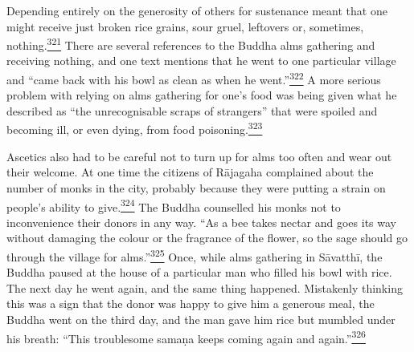 Depending entirely on the generosity of others for sustenance meant that
one might receive just broken rice grains, sour gruel, leftovers or,
sometimes,
nothing.\label{footprints_split_011.html_fnref321}\hyperref[footprints_split_024.htmlux5cux23fn321]{\textsuperscript{321}}
There are several references to the Buddha alms gathering and receiving
nothing, and one text mentions that he went to one particular village
and ``came back with his bowl as clean as when he
went.''\label{footprints_split_011.html_fnref322}\hyperref[footprints_split_024.htmlux5cux23fn322]{\textsuperscript{322}}
A more serious problem with relying on alms gathering for one's food was
being given what he described as ``the unrecognisable scraps of
strangers'' that were spoiled and becoming ill, or even dying, from food
poisoning.\label{footprints_split_011.html_fnref323}\hyperref[footprints_split_024.htmlux5cux23fn323]{\textsuperscript{323}}

Ascetics also had to be careful not to turn up for alms too often and
wear out their welcome. At one time the citizens of Rājagaha complained
about the number of monks in the city, probably because they were
putting a strain on people's ability to
give.\label{footprints_split_011.html_fnref324}\hyperref[footprints_split_024.htmlux5cux23fn324]{\textsuperscript{324}}
The Buddha counselled his monks not to inconvenience their donors in any
way. ``As a bee takes nectar and goes its way without damaging the
colour or the fragrance of the flower, so the sage should go through the
village for
alms.''\label{footprints_split_011.html_fnref325}\hyperref[footprints_split_024.htmlux5cux23fn325]{\textsuperscript{325}}
Once, while alms gathering in Sāvatthī, the Buddha paused at the house
of a particular man who filled his bowl with rice. The next day he went
again, and the same thing happened. Mistakenly thinking this was a sign
that the donor was happy to give him a generous meal, the Buddha went on
the third day, and the man gave him rice but mumbled under his breath:
``This troublesome samaṇa keeps coming again and
again.''\label{footprints_split_011.html_fnref326}\hyperref[footprints_split_024.htmlux5cux23fn326]{\textsuperscript{326}}

